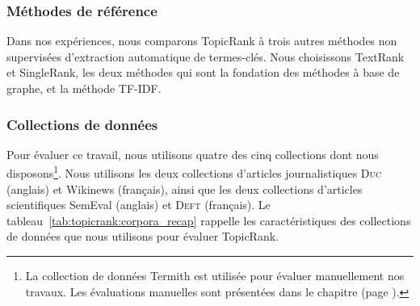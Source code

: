       \subsubsection{Méthodes de référence}
      \label{subsubsec:main-automatic_keyphrase_annotation-unsupervised_automatic_keyphrase_extraction-evaluation-baselines}
        Dans nos expériences, nous comparons TopicRank à trois autres
        méthodes non supervisées d'extraction automatique de termes-clés. Nous
        choisissons TextRank et SingleRank, les deux méthodes qui sont la
        fondation des méthodes à base de graphe, et la méthode TF-IDF.

      \subsubsection{Collections de données}
      \label{subsubsec:main-automatic_keyphrase_annotation-unsupervised_automatic_keyphrase_extraction-evaluation-evaluation_data}
        Pour évaluer ce travail, nous utilisons quatre des cinq collections dont
        nous disposons\footnote{La collection de données Termith est utilisée
        pour évaluer manuellement nos travaux. Les évaluations manuelles sont
        présentées dans le chapitre  (page \TODO{}).}. Nous utilisons
        les deux collections d'articles journalistiques \textsc{Duc} (anglais)
        et Wikinews (français), ainsi que les deux collections d'articles
        scientifiques SemEval (anglais) et \textsc{Deft} (français).
        Le tableau~\ref{tab:topicrank:corpora_recap} rappelle les
        caractéristiques des collections de données que nous utilisons pour
        évaluer TopicRank.

